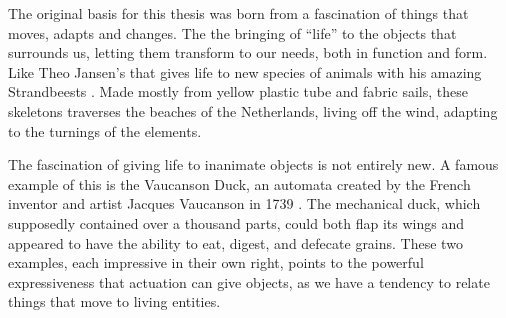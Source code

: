 The original basis for this thesis was born from a fascination of things that moves, adapts and changes.
The the bringing of ``life'' to the objects that surrounds us, letting them transform to our needs, both in function and form. 
Like Theo Jansen's that gives life to new species of animals with his amazing Strandbeests \cite{strandbeestJansen}. 
Made mostly from yellow plastic tube and fabric sails, these skeletons traverses the beaches of the Netherlands, living off the wind, adapting to the turnings of the elements.

The fascination of giving life to inanimate objects is not entirely new.
A famous example of this is the Vaucanson Duck, an automata created by the French inventor and artist Jacques Vaucanson in 1739 \citep{riskin2003defecating}.
The mechanical duck, which supposedly contained over a thousand parts, could both flap its wings and appeared to have the ability to eat, digest, and defecate grains.
These two examples, each impressive in their own right, points to the powerful expressiveness that actuation can give objects, as we have a tendency to relate things that move to living entities.  

